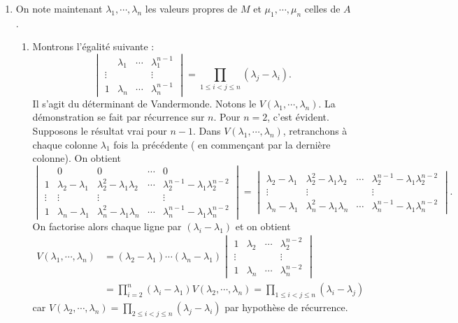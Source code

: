 {{\begin {enumerate}
  \item On note maintenant $\lambda_1,\cdots,\lambda_n$ les valeurs propres de $M$ et 
$\mu_1,\cdots,\mu_n$ celles de $A$.
  \begin {enumerate}
    \item  Montrons l'\'egalit\'e suivante :
$$\begin{vmatrix} &\lambda_1 &\cdots &\lambda_1^{n-1} \\ 
\vdots& & &\vdots \\  1 &\lambda_n &\cdots & \lambda_n^{n-1}\end{vmatrix}=
\prod_{1\leq i<j\leq n}(\lambda_j-\lambda_i).$$
Il s'agit du d\'eterminant de Vandermonde. Notons le $V(\lambda_1,\cdots,\lambda_n)$. La d\'emonstration se fait par r\'ecurrence sur $n$.
Pour $n=2$, c'est \'evident. Supposons le r\'esultat vrai pour $n-1$. Dans $V(\lambda_1,\cdots,\lambda_n)$, retranchons \`a chaque colonne $\lambda_1$ fois la pr\'ec\'edente ( en commen\c cant par la derni\`ere colonne). On obtient 
$$\begin{vmatrix}
&0&0&\cdots&0 \\ 
1& \lambda_2-\lambda_1&\lambda_2^2-\lambda_1\lambda_2&\cdots&\lambda_2^{n-1}-\lambda_1\lambda_2^{n-2} \\  \vdots&\vdots&\vdots& &\vdots \\  1&\lambda_n-\lambda_1&\lambda_n^2-\lambda_1\lambda_n&\cdots&\lambda_n^{n-1}-\lambda_1\lambda_n^{n-2}
\end{vmatrix}
=
\begin{vmatrix}
\lambda_2-\lambda_1&\lambda_2^2-\lambda_1\lambda_2&\cdots&\lambda_2^{n-1}-\lambda_1\lambda_2^{n-2} \\ 
\vdots&\vdots& &\vdots \\ \lambda_n-\lambda_1&\lambda_n^2-\lambda_1\lambda_n&\cdots&\lambda_n^{n-1}-\lambda_1\lambda_n^{n-2}
\end{vmatrix}.$$
On factorise alors chaque ligne par $(\lambda_i-\lambda_1)$ et on obtient
$$\begin{align*}
V(\lambda_1,\cdots,\lambda_n)&=(\lambda_2-\lambda_1)\cdots(\lambda_n-\lambda_1)
\begin{vmatrix}1 &\lambda_2 &\cdots &\lambda_2^{n-2} \\ 
\vdots& & &\vdots \\  1 &\lambda_n &\cdots & \lambda_n^{n-2}\end{vmatrix} \\ 
&= \prod_{i=2}^n(\lambda_i-\lambda_1)V(\lambda_2,\cdots,\lambda_n)=\prod_{1\leq i<j\leq n}(\lambda_i-\lambda_j)
\end{align*}$$
car $V(\lambda_2,\cdots,\lambda_n)=\prod_{2\leq i<j\leq n}(\lambda_j-\lambda_i)$ 
par hypoth\`ese de r\'ecurrence.



\end{enumerate}
\end{enumerate}}}
